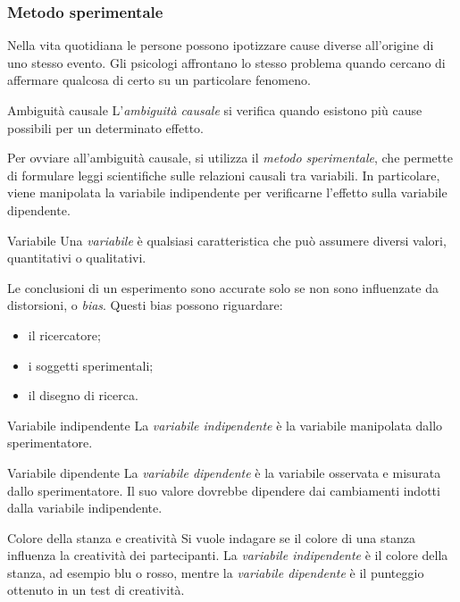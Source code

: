 \documentclass[a4paper]{article}
\begin{document}
\subsubsection{Metodo sperimentale}
Nella vita quotidiana le persone possono ipotizzare cause diverse all'origine di uno stesso evento. Gli psicologi affrontano lo stesso problema quando cercano di affermare qualcosa di certo su un particolare fenomeno.
\begin{snippetdefinition}{Ambiguità causale}
    L'\emph{ambiguità causale} si verifica quando esistono più cause possibili per un determinato effetto.
\end{snippetdefinition}
Per ovviare all'ambiguità causale, si utilizza il \emph{metodo sperimentale}, che permette di formulare leggi scientifiche sulle relazioni causali tra variabili. In particolare, viene manipolata la variabile indipendente per verificarne l'effetto sulla variabile dipendente.
\begin{snippetdefinition}{Variabile}
    Una \emph{variabile} è qualsiasi caratteristica che può assumere diversi valori, quantitativi o qualitativi.
\end{snippetdefinition}
Le conclusioni di un esperimento sono accurate solo se non sono influenzate da distorsioni, o \emph{bias}. Questi bias possono riguardare:
\begin{itemize}
    \item il ricercatore;
    \item i soggetti sperimentali;
    \item il disegno di ricerca.
\end{itemize}
\begin{snippetdefinition}{Variabile indipendente}
    La \emph{variabile indipendente} è la variabile manipolata dallo sperimentatore.
\end{snippetdefinition}
\begin{snippetdefinition}{Variabile dipendente}
    La \emph{variabile dipendente} è la variabile osservata e misurata dallo sperimentatore. Il suo valore dovrebbe dipendere dai cambiamenti indotti dalla variabile indipendente.
\end{snippetdefinition}
\begin{snippetexample}{Colore della stanza e creatività}
    Si vuole indagare se il colore di una stanza influenza la creatività dei partecipanti. La \emph{variabile indipendente} è il colore della stanza, ad esempio blu o rosso, mentre la \emph{variabile dipendente} è il punteggio ottenuto in un test di creatività.
\end{snippetexample}
\end{document}
